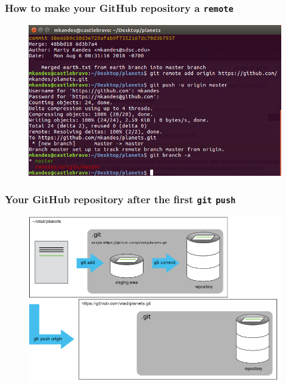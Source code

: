 \documentclass{beamer}
\begin{document}
\begin{frame}
   \frametitle{How to make your GitHub repository a \texttt{remote}}
   \begin{figure}[htbp]
      \includegraphics[width=1.0\textwidth]{images/git-add-github-remote-and-push.png}
   \end{figure}
\end{frame}

\begin{frame}
   \frametitle{Your GitHub repository after the first \texttt{git} \texttt{push}}
   \begin{figure}[htbp]
      \includegraphics[width=1.0\textwidth]{images/github-repo-after-first-push-diagram.png}
   \end{figure}
\end{frame}
\end{document}
